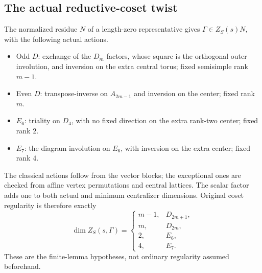 \documentclass[11pt,a4paper]{article}
\theoremstyle{definition}
\theoremstyle{remark}
\begin{document}
\subsection{The actual reductive-coset twist}
The normalized residue \(N\) of a length-zero representative gives
\(\Gamma\in Z_S(s)N\), with the following actual actions.
\begin{itemize}
\item Odd \(D\): exchange of the \(D_m\) factors, whose square is the
orthogonal outer involution, and inversion on the extra central
torus; fixed semisimple rank \(m-1\).
\item Even \(D\): transpose-inverse on \(A_{2m-1}\) and inversion on
the center; fixed rank \(m\).
\item \(E_6\): triality on \(D_4\), with no fixed direction on the
extra rank-two center; fixed rank \(2\).
\item \(E_7\): the diagram involution on \(E_6\), with inversion on
the extra center; fixed rank \(4\).
\end{itemize}
The classical actions follow from the vector blocks; the exceptional
ones are checked from affine vertex permutations and central lattices.
The scalar factor adds one to both actual and minimum centralizer
dimensions. Original coset regularity is therefore exactly
\[
\dim Z_S(s,\Gamma)=
\begin{cases}
m-1,&D_{2m+1},\\
m,&D_{2m},\\
2,&E_6,\\
4,&E_7.
\end{cases}
\]
These are the finite-lemma hypotheses, not ordinary regularity
assumed beforehand.
\end{document}
